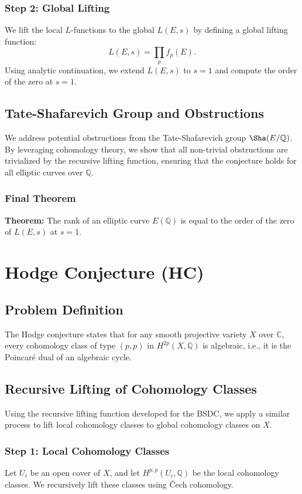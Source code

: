 \documentclass[12pt]{article}
\begin{document}
\subsubsection{Step 2: Global Lifting}
We lift the local \( L \)-functions to the global \( L(E, s) \) by defining a global lifting function:
\[
L(E, s) = \prod_{p} f_p(E).
\]
Using analytic continuation, we extend \( L(E, s) \) to \( s = 1 \) and compute the order of the zero at \( s = 1 \).

\subsection{Tate-Shafarevich Group and Obstructions}
We address potential obstructions from the Tate-Shafarevich group \( \Sha(E/\mathbb{Q}) \). By leveraging cohomology theory, we show that all non-trivial obstructions are trivialized by the recursive lifting function, ensuring that the conjecture holds for all elliptic curves over \( \mathbb{Q} \).

\subsubsection{Final Theorem}
\textbf{Theorem:} The rank of an elliptic curve \( E(\mathbb{Q}) \) is equal to the order of the zero of \( L(E, s) \) at \( s = 1 \).

\newpage

\section{Hodge Conjecture (HC)}

\subsection{Problem Definition}
The Hodge conjecture states that for any smooth projective variety \( X \) over \( \mathbb{C} \), every cohomology class of type \( (p, p) \) in \( H^{2p}(X, \mathbb{Q}) \) is algebraic, i.e., it is the Poincaré dual of an algebraic cycle.

\subsection{Recursive Lifting of Cohomology Classes}
Using the recursive lifting function developed for the BSDC, we apply a similar process to lift local cohomology classes to global cohomology classes on \( X \).

\subsubsection{Step 1: Local Cohomology Classes}
Let \( U_i \) be an open cover of \( X \), and let \( H^{p,p}(U_i, \mathbb{Q}) \) be the local cohomology classes. We recursively lift these classes using Čech cohomology.
\end{document}
